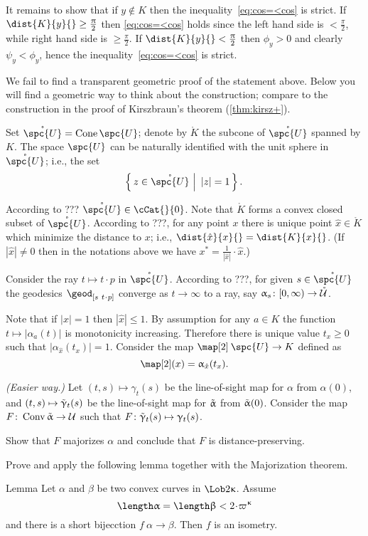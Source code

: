 It remains to show that if $y\notin K$ 
then the inequality~\ref{eq:cos=<cos}
is strict.
If $\dist{K}{y}{}\ge\tfrac\pi2$ then \ref{eq:cos=<cos} holds since 
the left hand side is $<\tfrac\pi2$,
while right hand side is $\ge \tfrac\pi2$.
If $\dist{K}{y}{}<\tfrac\pi2$ then $\phi_y>0$ and clearly $\psi_y<\phi_y$,
hence the inequality~\ref{eq:cos=<cos} is strict.
\qeds

We fail to find a transparent geometric proof of the statement above.
Below you will find a geometric way to think about the construction; 
compare to the construction 
in the proof of Kirszbraun's theorem (\ref{thm:kirsz+}).

Set $\mathring{\spc{U}}=\Cone \spc{U}$;
denote by $\mathring{K}$ the subcone of $\mathring{\spc{U}}$ spanned by $K$.
The space $\spc{U}$ can be naturally identified with the unit sphere in $\mathring{\spc{U}}$;
i.e., the set 
\[\set{z\in \mathring{\spc{U}}}{|z|=1}.\]

According to ??? $\mathring{\spc{U}}\in\cCat{}{0}$.
Note that $\mathring{K}$ forms a convex closed subset of $\mathring{\spc{U}}$.
According to ???, for any point $x$ there is unique point $\hat x\in \mathring{K}$
which minimize the distance to $x$;
i.e., $\dist{\hat x}{x}{}=\dist{K}{x}{}$.
(If $|\hat x|\ne0$ then in the notations above we have
$x^*=\tfrac1{|\hat x|}\cdot\hat x$.)

Consider the ray $t\mapsto t\cdot p$ in  $\mathring{\spc{U}}$.
According to ???, %
for given $s\in \mathring{\spc{U}}$
the geodesics $\geod_{[s\ t\cdot p]}$ converge as $t\to\infty$ to a ray, 
say $\alpha_s\:[0,\infty)\to \mathring{\spc{U}}$.



Note that if $|x|=1$ then $|\hat x|\le 1$.
By assumption for any $a\in K$ the function $t\mapsto |\alpha_a(t)|$ is monotonicity increasing.
Therefore there is unique value $t_x\ge 0$ such that
$|\alpha_{\hat x}(t_x)|=1$.
Consider the map $\map[2]\:\spc{U}\to K$
defined as 
\[\map[2](x)=\alpha_{\hat x}(t_x).\]


\textit{(Easier way.)} 
Let 
$(t,s)\mapsto \gamma_t(s)$ be the line-of-sight map 
for $\alpha$ from $\alpha(0)$,
and 
$(t,s)\mapsto \~\gamma_t(s)$ be the line-of-sight map 
for $\~\alpha$ from $\~\alpha(0)$.
Consider the map  $F\:\Conv\~\alpha\to \spc{U}$ such that 
$F\:\~\gamma_t(s)\mapsto \gamma_t(s)$.

Show that $F$ majorizes $\alpha$
and conclude that $F$ is distance-preserving.

Prove and apply the following lemma together with the Majorization theorem.
\begin{thm}{Lemma}\label{lem:short+convex}
Let $\alpha$ and $\beta$ be two convex curves in $\Lob2\kappa$.
Assume 
\[\length \alpha=\length\beta<2\cdot\varpi\kappa\]
and there is a short bijecction $f\:\alpha\to\beta$.
Then $f$ is an isometry.
\end{thm}

